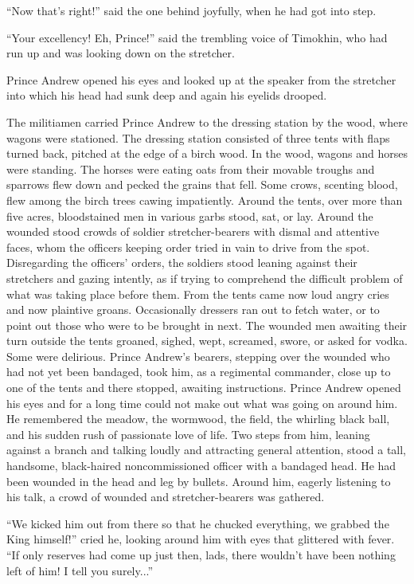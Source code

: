 ``Now that's right!'' said the one behind joyfully, when he had
got into step.

``Your excellency! Eh, Prince!'' said the trembling voice of
Timokhin, who had run up and was looking down on the stretcher.

Prince Andrew opened his eyes and looked up at the speaker from
the stretcher into which his head had sunk deep and again his
eyelids drooped.

The militiamen carried Prince Andrew to the dressing station by
the wood, where wagons were stationed. The dressing station
consisted of three tents with flaps turned back, pitched at the
edge of a birch wood.  In the wood, wagons and horses were
standing. The horses were eating oats from their movable troughs
and sparrows flew down and pecked the grains that fell. Some
crows, scenting blood, flew among the birch trees cawing
impatiently. Around the tents, over more than five acres,
bloodstained men in various garbs stood, sat, or lay. Around the
wounded stood crowds of soldier stretcher-bearers with dismal and
attentive faces, whom the officers keeping order tried in vain to
drive from the spot. Disregarding the officers' orders, the
soldiers stood leaning against their stretchers and gazing
intently, as if trying to comprehend the difficult problem of
what was taking place before them. From the tents came now loud
angry cries and now plaintive groans. Occasionally dressers ran
out to fetch water, or to point out those who were to be brought
in next. The wounded men awaiting their turn outside the tents
groaned, sighed, wept, screamed, swore, or asked for vodka. Some
were delirious. Prince Andrew's bearers, stepping over the
wounded who had not yet been bandaged, took him, as a regimental
commander, close up to one of the tents and there stopped,
awaiting instructions. Prince Andrew opened his eyes and for a
long time could not make out what was going on around him. He
remembered the meadow, the wormwood, the field, the whirling
black ball, and his sudden rush of passionate love of life. Two
steps from him, leaning against a branch and talking loudly and
attracting general attention, stood a tall, handsome,
black-haired noncommissioned officer with a bandaged head. He had
been wounded in the head and leg by bullets. Around him, eagerly
listening to his talk, a crowd of wounded and stretcher-bearers
was gathered.

``We kicked him out from there so that he chucked everything, we
grabbed the King himself!'' cried he, looking around him with
eyes that glittered with fever. ``If only reserves had come up
just then, lads, there wouldn't have been nothing left of him! I
tell you surely...''

